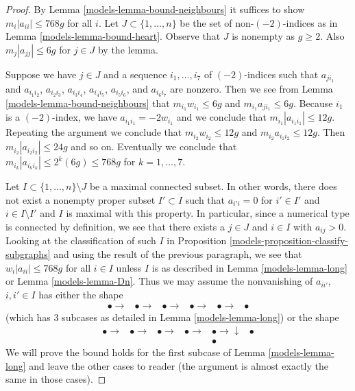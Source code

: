 \begin{proof}

By Lemma \ref{models-lemma-bound-neighbours} it suffices to show
$m_i|a_{ii}| \leq 768g$ for all $i$.
Let $J \subset \{1, \ldots, n\}$ be the set of non-$(-2)$-indices
as in Lemma \ref{models-lemma-bound-heart}. Observe that $J$ is
nonempty as $g \geq 2$. Also $m_j|a_{jj}| \leq 6g$ for $j \in J$
by the lemma.

\medskip\noindent
Suppose we have $j \in J$ and a sequence $i_1, \ldots, i_7$
of $(-2)$-indices such that $a_{ji_1}$ and $a_{i_1i_2}$,
$a_{i_2i_3}$, $a_{i_3i_4}$, $a_{i_4i_5}$, $a_{i_5i_6}$, and
$a_{i_6i_7}$ are nonzero. Then we see from
Lemma \ref{models-lemma-bound-neighbours}
that $m_{i_1}w_{i_1} \leq 6g$ and $m_{i_1}a_{ji_1} \leq 6g$.
Because $i_1$ is a $(-2)$-index, we have $a_{i_1i_1} = -2w_{i_1}$
and we conclude that $m_{i_1}|a_{i_1i_1}| \leq 12g$.
Repeating the argument we conclude that
$m_{i_2}w_{i_2} \leq 12g$ and $m_{i_2}a_{i_1i_2} \leq 12g$.
Then $m_{i_2}|a_{i_2i_2}| \leq 24g$ and so on.
Eventually we conclude that
$m_{i_k}|a_{i_ki_k}| \leq 2^k(6g) \leq 768g$ for $k = 1, \ldots, 7$.

\medskip\noindent
Let $I \subset \{1, \ldots, n\} \setminus J$ be a maximal connected subset.
In other words, there does not exist a nonempty proper subset
$I' \subset I$ such that
$a_{i'i} = 0$ for $i' \in I'$ and $i \in I \setminus I'$
and $I$ is maximal with this property. In particular, since
a numerical type is connected by definition, we see that there
exists a $j \in J$ and $i \in I$ with $a_{ij} > 0$.
Looking at the classification
of such $I$ in Proposition \ref{models-proposition-classify-subgraphs}
and using the result of the previous paragraph, we see that
$w_i|a_{ii}| \leq 768g$ for all $i \in I$ unless $I$ is as described in
Lemma \ref{models-lemma-long} or
Lemma \ref{models-lemma-Dn}.
Thus we may assume the nonvanishing of $a_{ii'}$, $i, i' \in I$
has either the shape
$$
\begin{array}{cccccc}\bullet \longrightarrow & \bullet \longrightarrow & \bullet \longrightarrow & \bullet \longrightarrow & \bullet \longrightarrow & \bullet\end{array}
$$
(which has 3 subcases as detailed in Lemma \ref{models-lemma-long})
or the shape
$$
\begin{array}{cccccc}\bullet \longrightarrow & \bullet \longrightarrow & \bullet \longrightarrow & \bullet \longrightarrow & \bullet \longrightarrow\downarrow & \bullet \\  &  &  &  & \bullet & \end{array}
$$
We will prove the bound holds for the first subcase of
Lemma \ref{models-lemma-long} and leave the other cases to reader (the argument
is almost exactly the same in those cases).


\end{proof}
